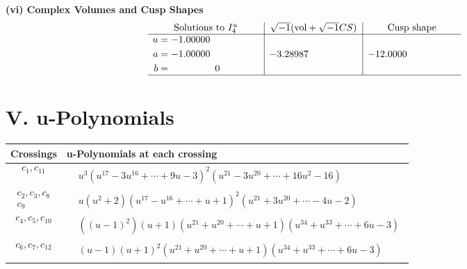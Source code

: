 \documentclass[1p]{elsarticle_modified}
\theoremstyle{definition}
\newcommand{\I}{\sqrt{-1}}
\begin{document}
\newpage\flushleft \textbf{(vi) Complex Volumes and Cusp Shapes}
$$\begin{array}{c|c|c}  
\text{Solutions to }I^u_{4}& \I (\text{vol} + \sqrt{-1}CS) & \text{Cusp shape}\\
 \hline 
\begin{aligned}
u &= -1.00000\phantom{ +0.000000I} \\
a &= -1.00000\phantom{ +0.000000I} \\
b &= \phantom{-0.000000 } 0\end{aligned}
 & -3.28987\phantom{ +0.000000I} & -12.0000\phantom{ +0.000000I}\\
 \hline 
 \end{array}$$\newpage
\newpage\renewcommand{\arraystretch}{1}
\centering \section*{ V. u-Polynomials}
\begin{tabular}{m{50pt}|m{274pt}}
Crossings & \hspace{64pt}u-Polynomials at each crossing \\
\hline $$\begin{aligned}c_{1},c_{11}\end{aligned}$$&$\begin{aligned}
&u^3(u^{17}-3 u^{16}+\cdots+9 u-3)^{2}(u^{21}-3 u^{20}+\cdots+16 u^2-16)
\end{aligned}$\\
\hline $$\begin{aligned}c_{2},c_{3},c_{8}\\c_{9}\end{aligned}$$&$\begin{aligned}
&u(u^2+2)(u^{17}- u^{16}+\cdots+u+1)^{2}(u^{21}+3 u^{20}+\cdots-4 u-2)
\end{aligned}$\\
\hline $$\begin{aligned}c_{4},c_{5},c_{10}\end{aligned}$$&$\begin{aligned}
&((u-1)^2)(u+1)(u^{21}+u^{20}+\cdots+u+1)(u^{34}+u^{33}+\cdots+6 u-3)
\end{aligned}$\\
\hline $$\begin{aligned}c_{6},c_{7},c_{12}\end{aligned}$$&$\begin{aligned}
&(u-1)(u+1)^2(u^{21}+u^{20}+\cdots+u+1)(u^{34}+u^{33}+\cdots+6 u-3)
\end{aligned}$\\
\hline
\end{tabular}\newpage\renewcommand{\arraystretch}{1}
\end{document}
